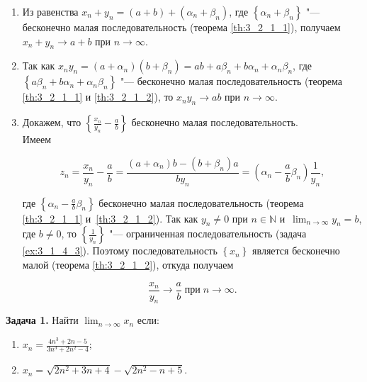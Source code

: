\begin{enumerate}
\item Из равенства $x_{n} + y_{n} = (a + b) + (\alpha_{n} + \beta_{n})$,
где $\left\{ \alpha_{n} + \beta_{n} \right\}$ "--- бесконечно малая последовательность
(теорема \ref{th:3_2_1_1}), получаем $x_{n} + y_{n} \to a + b$ при $n \to \infty$.

\item Так как
$x_{n}y_{n} = (a + \alpha_{n})(b + \beta_{n}) = ab + a\beta_{n} + b\alpha_{n} + \alpha_{n}\beta_{n}$,
где $\left\{ a\beta_{n} + b\alpha_{n} + \alpha_{n}\beta_{n} \right\}$
"--- бесконечно малая последовательность (теорема \ref{th:3_2_1_1} и  \ref{th:3_2_1_2}),
то $x_{n}y_{n} \to ab$ при $n \to \infty$.

\item Докажем, что $\displaystyle \left\{ \frac{x_{n}}{y_{n}} - \frac{a}{b} \right\}$
бесконечно малая последовательность. \\
Имеем

\begin{equation*}
\displaystyle z_{n} = \frac{x_{n}}{y_{n}} - \frac{a}{b} =
\frac{(a+\alpha_{n})b - (b + \beta_{n})a}{by_{n}} =
\left( \alpha_{n} - \frac{a}{b}\beta_{n} \right) \frac{1}{y_{n}},
\end{equation*}

где $\displaystyle \left\{ \alpha_{n} - \frac{a}{b}\beta_{n} \right\}$
бесконечно малая последовательность (теорема \ref{th:3_2_1_1} и~\ref{th:3_2_1_2}).
Так как $y_{n} \ne 0$ при $n \in \mathbb{N}$ и~$\displaystyle \lim_{n \to \infty} y_{n} = b$,
где $b \ne 0$, то $\displaystyle \left\{ \frac{1}{y_{n}} \right\}$ "---
ограниченная последовательность (задача \ref{ex:3_1_4_3}).
Поэтому последовательность $\left\{ x_{n} \right\}$ является бесконечно малой
(теорема \ref{th:3_2_1_2}), откуда получаем

\begin{equation*}
\displaystyle \frac{x_{n}}{y_{n}} \to \frac{a}{b} \; \text{при} \; n \to \infty.
\end{equation*}

\end{enumerate}

\textbf{Задача 1.}\label{ex:3_2_3_1} Найти $\displaystyle \lim_{n \to \infty} x_{n}$ если:

\begin{enumerate}
\item
$\displaystyle x_{n} = \frac{4n^{3} + 2n - 5}{3n^{3} + 2n^{2} - 4}$;
\item
$\displaystyle x_{n} = \sqrt{2n^{2} + 3n + 4} - \sqrt{2n^{2} - n + 5}$.
\end{enumerate}

